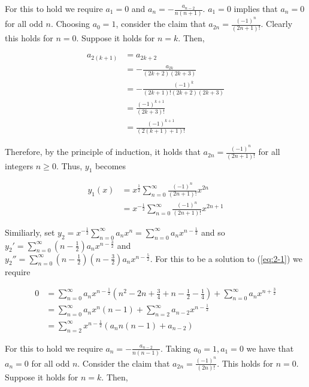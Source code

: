 \documentclass{article}
\begin{document}
For this to hold we require $a_1 = 0$ and $a_n = -\frac{a_{n - 2}}{n(n + 1)}$. $a_1 = 0$ implies that
$a_n = 0$ for all odd $n$. Choosing $a_0 = 1$, consider the claim that $a_{2n} = \frac{(-1)^n}{(2n + 1)!}$. Clearly
this holds for $n = 0$. Suppose it holds for $n = k$. Then,

\begin{align*}
    a_{2(k + 1)} &= a_{2k + 2}\\
    &= -\frac{a_{2k}}{(2k + 2)(2k + 3)}\\
    &=  -\frac{(-1)^{k}}{(2k + 1)!(2k + 2)(2k + 3)}\\
    &= \frac{(-1)^{k + 1}}{(2k + 3)!}\\
    &= \frac{(-1)^{k + 1}}{(2(k + 1) + 1)!}
\end{align*}

Therefore, by the principle of induction, it holds that $a_{2n} = \frac{(-1)^n}{(2n + 1)!}$ for all integers $n \geq 0$.
Thus, $y_1$ becomes

\begin{align}
    y_1(x) &= x^\frac{1}{2}\sum_{n = 0}^\infty \frac{(-1)^n}{(2n + 1)!}x^{2n}\nonumber\\
    &= x^{-\frac{1}{2}} \sum_{n = 0}^\infty \frac{(-1)^n}{(2n + 1)!}x^{2n + 1} \label{eq:2-2}
\end{align}

Similiarly, set $y_2 = x^{-\frac{1}{2}}\sum_{n = 0}^\infty a_nx^{n}
= \sum_{n = 0}^\infty a_nx^{n - \frac{1}{2}}$ and so
$y_2' = \sum_{n = 0}^\infty (n - \frac{1}{2})a_nx^{n - \frac{3}{2}}$ and\\
$y_2'' = \sum_{n = 0}^\infty (n - \frac{1}{2})(n - \frac{3}{2})a_nx^{n - \frac{5}{2}}$.
For this to be a solution to (\ref{eq:2-1}) we require

\begin{align*}
    0 &= \sum_{n = 0}^\infty a_nx^{n - \frac{1}{2}}\left(n^2 - 2n + \frac{3}{4} + n - \frac{1}{2} - \frac{1}{4}\right)
        + \sum_{n = 0}^\infty a_nx^{n + \frac{3}{2}}\\
    &= \sum_{n = 0}^\infty a_nx^n(n - 1) + \sum_{n = 2}^\infty a_{n - 2}x^{n - \frac{1}{2}}\\
    &= \sum_{n = 2}^\infty x^{n - \frac{1}{2}}(a_nn(n - 1) + a_{n - 2})
\end{align*}

For this to hold we require $a_n = -\frac{a_{n - 2}}{n(n - 1)}$. Taking $a_0 = 1, a_1 = 0$ we have that $a_n = 0$ for all
odd $n$. Consider the claim that $a_{2n} = \frac{(-1)^n}{(2n)!}$. This holds for $n = 0$. Suppose
it holds for $n = k$. Then,
\end{document}
